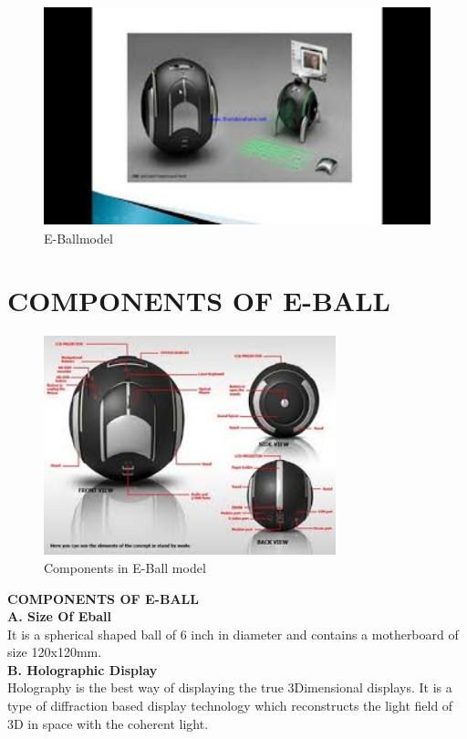 \documentclass{article}
\begin{document}
\begin{figure}[h]
\centering
\includegraphics[height=2.5in]{index7.jpg}
\caption[optional caption]{E-Ballmodel}
\label{fig1: E-Ball model}


\end{figure}


 



\newpage
\section{COMPONENTS OF E-BALL}

\begin{figure}[h]
\centering
\includegraphics[height=2.5in]{index3.jpg}
\caption[optional caption]{Components in E-Ball model}
\label{fig2: E-Ball model}
\end{figure}


\newpage
 
\textbf{COMPONENTS OF E-BALL}
 \\
\textbf{A. Size Of Eball}
\\
 It is a spherical shaped ball of 6 inch in diameter and contains a motherboard of size 120x120mm.
 \\
 \textbf{B. Holographic Display}\\
  Holography is the best way of displaying the true 3Dimensional displays. It is a type of diffraction based display technology which reconstructs the light field of 3D in space with the coherent light. 
 
\end{document}
